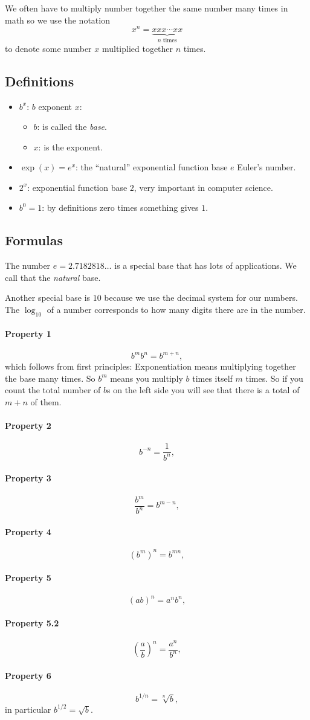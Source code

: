 \documentclass[twocolumn,8pt]{extarticle}
\newcommand{\dokutitleleveltree}[1]{\subsection{#1}}
\newcommand{\dokutitlelevelfive}[1]{\paragraph{#1}}
\newcommand{\dokuitalic}[1]{\textsl{#1}}
\newcommand{\dokuitem}{\item}
\begin{document}
We often have to multiply number together the same number many times
in math so we use the notation
\[
  x^n  = \underbrace{xxx \cdots xx}_{n \text{ times} }
\]
to denote some number \(x\) multiplied together \(n\) times.


\dokutitleleveltree{Definitions}
\label{9fdc1f6b239f0e86ec8651552f2b0683}%

\begin{itemize}
\dokuitem  \(b^x\): \(b\) exponent \(x\):
\begin{itemize}
\dokuitem  \(b\): is called the \dokuitalic{base}.
\dokuitem  \(x\): is the exponent.
\end{itemize}

\dokuitem  \(\exp(x)=e^x\): the ``natural'' exponential function base \(e\)  Euler's number.
\dokuitem  \(2^x\): exponential function base \(2\), very important in computer science.
\dokuitem  \(b^0=1\): by definitions zero times something gives \(1\).
\end{itemize}

\dokutitleleveltree{Formulas}
\label{51d24e1edefe34e683025dbba5c6eed6}%

The number \(e=2.7182818\ldots\) is a special base that has lots of applications.
We call that the \dokuitalic{natural} base.

Another special base is \(10\) because we use the decimal
system for our numbers.
The \(\log_{10}\) of a number corresponds to 
how many digits there are in the number. 


\dokutitlelevelfive{Property 1}

\[
   b^m b^n = b^{m+n},
\]
which follows from first principles:
Exponentiation means multiplying together the base many times.
So \(b^m\) means you multiply \(b\) times itself \(m\) times. So if you
count the total number of \(b\)s on the left side you will see that
there is a total of \(m+n\) of them.


\dokutitlelevelfive{Property 2}
\[
   b^{-n} = \frac{1}{b^n},
\]


\dokutitlelevelfive{Property 3}
\[
   \frac{b^m}{b^n} = b^{m-n},
\]


\dokutitlelevelfive{Property 4}
\[
   ({b^m})^n = b^{mn},
\]


\dokutitlelevelfive{Property 5}
\[
   (ab)^n = a^n b^n,
\]


\dokutitlelevelfive{Property 5.2}
\[
   \left(\frac{a}{b}\right)^n = \frac{a^n}{b^n},
\]


\dokutitlelevelfive{Property 6}
\[
  b^{1/n} = \sqrt[n]{b},
\]
in particular \(b^{1/2}=\sqrt{b}\).
\end{document}
